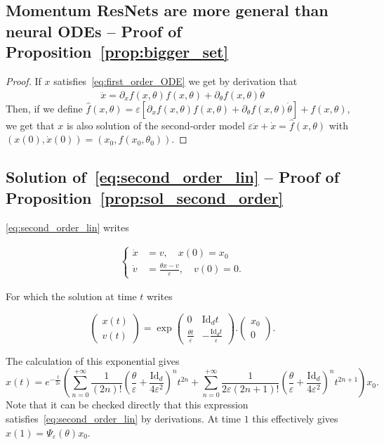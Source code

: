 \documentclass{article}
\begin{document}
\subsection{Momentum ResNets are more general than neural ODEs -- Proof of Proposition~\ref{prop:bigger_set}}
\begin{proof}
If $x$ satisfies~\eqref{eq:first_order_ODE} we get by derivation that
$$
\ddot{x} = \partial_xf(x,\theta)f(x,\theta) + \partial_\theta f(x,\theta)\dot{\theta}
$$
Then, if we define $\hat{f}(x,\theta) = \varepsilon[\partial_xf(x,\theta)f(x,\theta) + \partial_\theta f(x,\theta)\dot{\theta}] + f(x,\theta)$, we get that $x$ is also solution of the second-order model
$\varepsilon \ddot{x} + \dot{x} = \hat{f}(x,\theta)$
with 
$(x(0),\dot{x}(0)) = (x_0,f(x_0,\theta_0))$.
\end{proof} 


\subsection{Solution of~\eqref{eq:second_order_lin} -- Proof of Proposition~\ref{prop:sol_second_order}}

\eqref{eq:second_order_lin} writes

\begin{equation*}
\begin{split}
\begin{cases}
\dot{x} &= v, \quad x(0) = x_0 \\
\dot{v} &= \frac{\theta x - v}{\varepsilon}, \quad v(0) = 0.
\end{cases}
\end{split}
\end{equation*}

For which the solution at time $t$ writes

$$
\begin{pmatrix} 
x(t) \\ v(t) 
\end{pmatrix} = \exp{\begin{pmatrix}
0 & \mathrm{Id}_dt \\
\frac{\theta t}{\varepsilon} & - \frac{ \mathrm{Id}_d t}{\varepsilon} 
\end{pmatrix}} . \begin{pmatrix} 
x_0 \\ 0
\end{pmatrix}.
$$

The calculation of this exponential gives
$$
x(t) =  e^{-\frac{t}{2\varepsilon}} \left(\sum_{n=0}^{+\infty} \frac{1}{(2n)!}(\frac{\theta}{\varepsilon} + \frac{\mathrm{Id}_d}{4 \varepsilon^2})^nt^{2n} + \sum_{n=0}^{+\infty} \frac{1}{2\varepsilon(2n+1)!}(\frac{\theta}{\varepsilon} + \frac{\mathrm{Id}_d}{4 \varepsilon^2})^nt^{2n+1}\right)x_0.
$$
Note that it can be checked directly that this expression satisfies~\eqref{eq:second_order_lin} by derivations.
At time $1$ this effectively gives $x(1) = \Psi_{\varepsilon}(\theta)x_0$.
\end{document}

